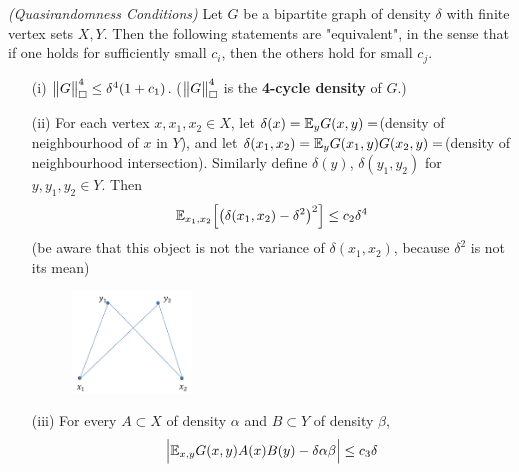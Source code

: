 \documentclass[12pt,a4paper]{report}
\begin{document}
 \emph{(Quasirandomness Conditions)} Let $G$ be a bipartite graph of density $\delta$ with finite vertex sets $X,Y$. Then the following statements are "equivalent", in the sense that if one holds for sufficiently small $c_i$, then the others hold for small $c_j$.
\begin{itemize}
\item[(i)] $\bigl\lVert G\bigr\rVert_{\tiny{\square}}^4 \leq \delta^4 (1+c_1)$. ($\bigl\lVert G\bigr\rVert_{\tiny{\square}}^4$ is the \textbf{4-cycle density} of $G$.)
\item[(ii)] For each vertex $x,x_1, x_2 \in X$, let $\delta(x) = \mathbb{E}_y G(x,y) =$(density of neighbourhood of $x$ in $Y$), and let $\delta(x_1,x_2) = \mathbb{E}_y G(x_1,y)G(x_2,y)=$(density of neighbourhood intersection). Similarly define $\delta(y)$, $\delta(y_1,y_2)$ for $y,y_1,y_2 \in Y$. Then
\begin{align*}
\mathbb{E}_{x_1,x_2} \Big[ \big( \delta(x_1,x_2) - \delta^2 \big)^2 \Big] \leq c_2 \delta^4
\end{align*}
(be aware that this object is not the variance of $\delta(x_1,x_2)$, because $\delta^2$ is not its mean)
\begin{figure}[h]
	\centering
	\includegraphics[width=0.3\textwidth]{2}
\end{figure}
\item[(iii)] For every $A \subset X$ of density $\alpha$ and $B\subset Y$ of density $\beta$,
\begin{align*}
\Big| \mathbb{E}_{x,y} G(x,y) A(x)B(y) - \delta \alpha \beta \Big| \leq c_3 \delta
\end{align*}
\end{itemize}
\end{document}
